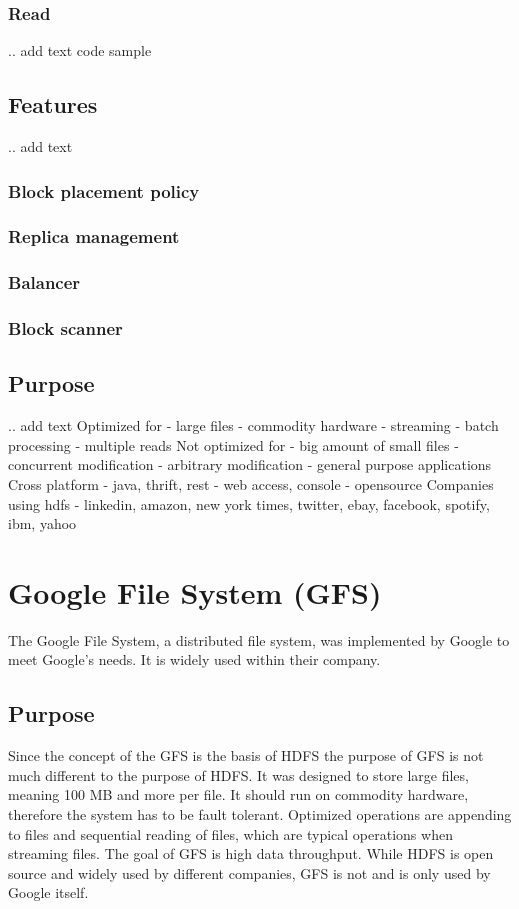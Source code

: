 \documentclass{sig-alternate}
\begin{document}
\subsubsection{Read}
.. add text code sample

\subsection{Features}
.. add text
\subsubsection{Block placement policy}
\subsubsection{Replica management}
\subsubsection{Balancer}
\subsubsection{Block scanner}

\subsection{Purpose}
.. add text
Optimized for
- large files
- commodity hardware
- streaming
- batch processing
- multiple reads
Not optimized for
- big amount of small files
- concurrent modification
- arbitrary modification
- general purpose applications
Cross platform
- java, thrift, rest
- web access, console
- opensource
Companies using hdfs
- linkedin, amazon, new york times, twitter, ebay, facebook, spotify, ibm, yahoo


\section{Google File System (GFS)}
The Google File System, a distributed file system, was implemented by Google to meet Google's needs. It is widely used within their company.
\subsection{Purpose}
Since the concept of the GFS is the basis of HDFS the purpose of GFS is not much different to the purpose of HDFS. It was designed to store large files, meaning 100 MB and more per file. It should run on commodity hardware, therefore the system has to be fault tolerant. Optimized operations are appending to files and sequential reading of files, which are typical operations when streaming files. The goal of GFS is high data throughput.
While HDFS is open source and widely used by different companies, GFS is not and is only used by Google itself.
\end{document}
